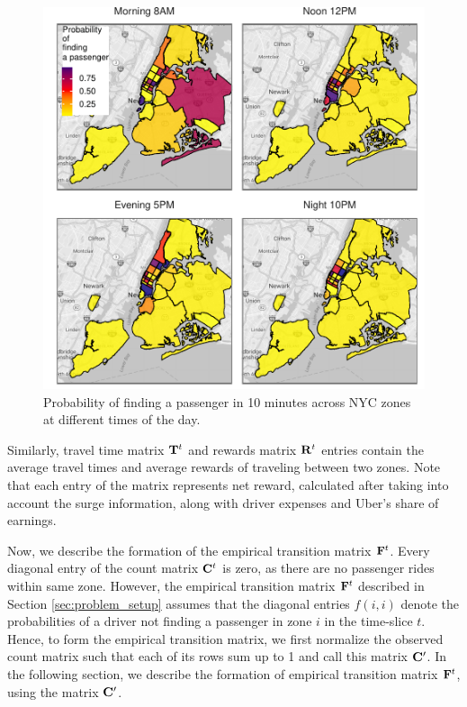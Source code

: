 \begin{figure}
	\centering
	\includegraphics{figures/successful_heatmap.pdf}
	\caption{Probability of finding a passenger in 10 minutes across NYC zones at different times of the day.}
	\label{fig:successful_heatmap}
\end{figure}

Similarly, travel time matrix ${\mathbf{T}}^t$ and rewards matrix ${\mathbf{R}}^t$ entries contain the average travel times and average rewards of traveling between two zones. Note that each entry of the {\rewardsmatrix} matrix represents net reward, calculated after taking into account the surge information, along with driver expenses and Uber's share of earnings.

Now, we describe the formation of the empirical transition matrix ${\mathbf{F}}^t$. Every diagonal entry of the count matrix ${\mathbf{C}}^t$ is zero, as there are no passenger rides within same zone. However, the empirical transition matrix ${\mathbf{F}}^t$ described in Section \ref{sec:problem_setup} assumes that the diagonal entries $f(i,i)$ denote the probabilities of a driver not finding a passenger in zone $i$ in the time-slice $t$. Hence, to form the empirical transition matrix, we first normalize the observed count matrix such that each of its rows sum up to 1 and call this matrix ${\mathbf{C}}^\prime$. 
In the following section, we describe the formation of empirical transition matrix ${\mathbf{F}}^t$, using the matrix ${\mathbf{C}}^\prime$.

